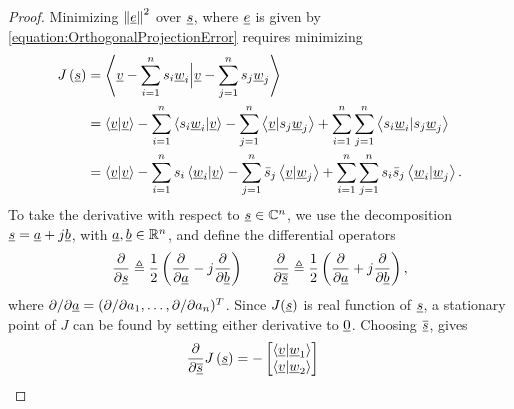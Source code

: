 \begin{proof}
Minimizing $\left\| \underline{e} \right\|^2$ over $\underline{s}$, where $\underline{e}$ is given by \eqref{equation:OrthogonalProjectionError} requires minimizing
\begin{equation*}
\begin{split}
J \left( \underline{s} \right)
&= \left\langle \underline{v} - \sum_{i=1}^n s_i \underline{w}_i \Big|
\underline{v} - \sum_{j=1}^n s_j \underline{w}_j \right\rangle \\
&= \left\langle \underline{v} | \underline{v} \right\rangle
- \sum_{i=1}^n \left\langle s_i \underline{w}_i | \underline{v} \right\rangle
- \sum_{j=1}^n \left\langle \underline{v} | s_j \underline{w}_j \right\rangle
+ \sum_{i=1}^n \sum_{j=1}^n \left\langle s_i \underline{w}_i | s_j \underline{w}_j \right\rangle \\
&= \left\langle \underline{v} | \underline{v} \right\rangle
- \sum_{i=1}^n s_i \left\langle \underline{w}_i | \underline{v} \right\rangle
- \sum_{j=1}^n \bar{s}_j \left\langle \underline{v} | \underline{w}_j \right\rangle
+ \sum_{i=1}^n \sum_{j=1}^n s_i \bar{s}_j \left\langle \underline{w}_i | \underline{w}_j \right\rangle .
\end{split}
\end{equation*}
To take the derivative with respect to  $\underline{s}\in \mathbb{C}^n$, we use the decomposition $\underline{s}=\underline{a}+j \underline{b}$, with $\underline{a},\underline{b}\in \mathbb{R}^n$, and define the differential operators
\begin{equation*}
\frac{\partial}{\partial\underline{s}} \triangleq \frac{1}{2}\left(\frac{\partial}{\partial\underline{a}}-j\frac{\partial}{\partial\underline{b}}\right)
\quad \quad
\frac{\partial}{\partial\underline{\overline{s}}} \triangleq \frac{1}{2}\left(\frac{\partial}{\partial\underline{a}}+j\frac{\partial}{\partial\underline{b}}\right),
\end{equation*}
where $\partial/\partial\underline{a} = (\partial/\partial a_1 , \ldots, \partial/\partial a_n )^T$.
Since $J(\underline{s})$ is real function of $\underline{s}$, a stationary point of $J$ can be found by setting either derivative to $\underline{0}$.
Choosing $\underline{\overline{s}}$, gives
\begin{equation*}
\begin{split}
\frac{\partial}{\partial\underline{\overline{s}}} J \left( \underline{s} \right)
&= - \begin{bmatrix}
\left\langle \underline{v} | \underline{w}_1 \right\rangle \\
\left\langle \underline{v} | \underline{w}_2 \right\rangle \\

\end{bmatrix}
\end{split}
\end{equation*}
\end{proof}
